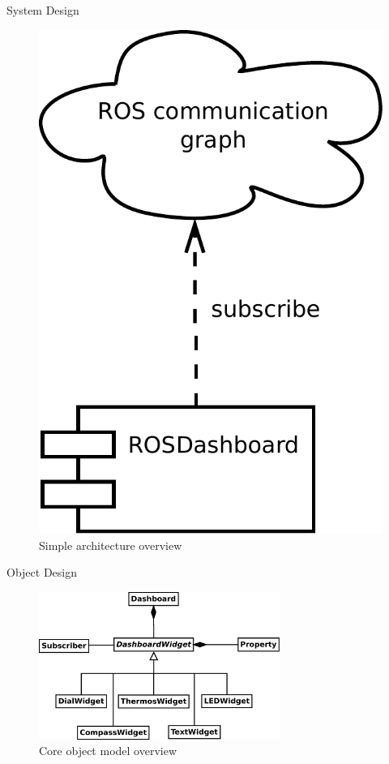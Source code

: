 \documentclass[compress]{beamer}
\begin{document}
\begin{frame}{System Design}
\begin{figure}[t]
    \centering
    \includegraphics[height=.7\textheight]{diagrams/simple_architecture_overview}
		\caption{Simple architecture overview}
\end{figure}
\end{frame}

\begin{frame}{Object Design}
\begin{figure}
    \centering
    \includegraphics[width=0.7\textwidth]{diagrams/class_overview}
    \caption[Core object model overview]{Core object model overview}
\end{figure}
\end{frame}
\end{document}
